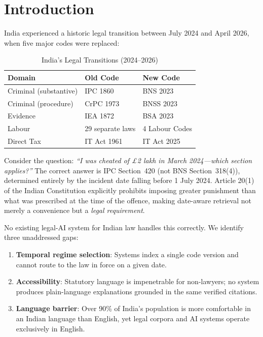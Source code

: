 \documentclass[conference]{IEEEtran}
\begin{document}
\section{Introduction}
\label{sec:intro}

India experienced a historic legal transition between July 2024 and April 2026, when five major codes were replaced:

\begin{table}[h]
\centering
\caption{India's Legal Transitions (2024--2026)}
\label{tab:transitions}
\begin{tabular}{@{}lll@{}}
\toprule
\textbf{Domain} & \textbf{Old Code} & \textbf{New Code} \\
\midrule
Criminal (substantive) & IPC 1860 & BNS 2023 \\
Criminal (procedure) & CrPC 1973 & BNSS 2023 \\
Evidence & IEA 1872 & BSA 2023 \\
Labour & 29 separate laws & 4 Labour Codes \\
Direct Tax & IT Act 1961 & IT Act 2025 \\
\bottomrule
\end{tabular}
\end{table}

Consider the question: \emph{``I was cheated of \pounds 2 lakh in March 2024---which section applies?''} The correct answer is IPC Section~420 (not BNS Section~318(4)), determined entirely by the incident date falling before 1 July 2024. Article 20(1) of the Indian Constitution explicitly prohibits imposing greater punishment than what was prescribed at the time of the offence, making date-aware retrieval not merely a convenience but a \emph{legal requirement}.

No existing legal-AI system for Indian law handles this correctly. We identify three unaddressed gaps:

\begin{enumerate}
    \item \textbf{Temporal regime selection}: Systems index a single code version and cannot route to the law in force on a given date.
    \item \textbf{Accessibility}: Statutory language is impenetrable for non-lawyers; no system produces plain-language explanations grounded in the same verified citations.
    \item \textbf{Language barrier}: Over 90\% of India's population is more comfortable in an Indian language than English, yet legal corpora and AI systems operate exclusively in English.
\end{enumerate}
\end{document}
